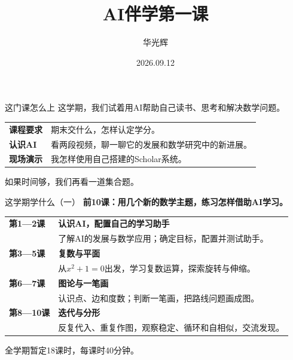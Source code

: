 \documentclass[aspectratio=169,10pt]{beamer}
\title[AI伴学 第一课]{\texorpdfstring{AI伴学\quad 第一课}{AI伴学 第一课}}
\author{华光辉}
\date{2026.09.12}
\newcommand{\key}[1]{{\color{campusgreen}\bfseries #1}}
\newcommand{\smallbody}{\fontsize{11}{15}\selectfont}
\begin{document}
\campusmaketitle

\begin{frame}[t]{这门课怎么上}
  这学期，我们试着用AI帮助自己读书、思考和解决数学问题。
  \par\vspace{8mm}
  \begin{tabular}{@{}lp{109mm}@{}}
    \key{课程要求} & 期末交什么，怎样认定学分。\\[5mm]
    \key{认识AI} & 看两段视频，聊一聊它的发展和数学研究中的新进展。\\[5mm]
    \key{现场演示} & 我怎样使用自己搭建的Scholar系统。\\
  \end{tabular}
  \vfill
  如果时间够，我们再看一道集合题。
\end{frame}


\begin{frame}[t,label=outlineone]{这学期学什么（一）}
  \smallbody
  \key{前10课：用几个新的数学主题，练习怎样借助AI学习。}
  \par\vspace{3mm}
  \begin{tabular}{@{}lp{113mm}@{}}
    \key{第1—2课} & \textbf{认识AI，配置自己的学习助手}\\[1mm]
                   & 了解AI的发展与数学应用；确定目标，配置并测试助手。\\[2mm]
    \key{第3—5课} & \textbf{复数与平面}\\[1mm]
                   & 从$x^2+1=0$出发，学习复数运算，探索旋转与伸缩。\\[2mm]
    \key{第6—7课} & \textbf{图论与一笔画}\\[1mm]
                   & 认识点、边和度数；判断一笔画，把路线问题画成图。\\[2mm]
    \key{第8—10课} & \textbf{迭代与分形}\\[1mm]
                   & 反复代入、重复作图，观察稳定、循环和自相似，交流发现。\\
  \end{tabular}
  \vfill
  {\fontsize{9}{12}\selectfont 全学期暂定18课时，每课时40分钟。}
\end{frame}
\end{document}
